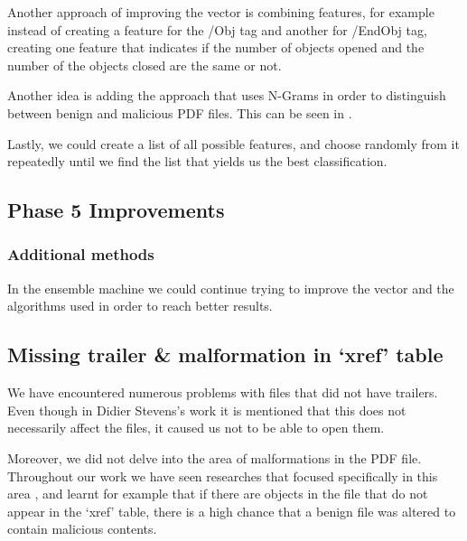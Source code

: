 \documentclass{article}
\begin{document}
\indent Another approach of improving the vector is combining features, for example instead of creating a feature for the /Obj tag and another for /EndObj tag, creating one feature that indicates if the number of objects opened and the number of the objects closed are the same or not.

\indent Another idea is adding the approach that uses N-Grams in order to distinguish between benign and malicious PDF files. This can be seen in \cite{Joachims1999Thorsten}.

\indent Lastly, we could create a list of all possible features, and choose randomly from it repeatedly until we find the list that yields us the best classification.

\subsection{Phase 5 Improvements}
\subsubsection{Additional methods}
\indent In the ensemble machine we could continue trying to improve the vector and the algorithms used in order to reach better results.

\subsection{Missing trailer \& malformation in ‘xref’ table}
\indent We have encountered numerous problems with files that did not have trailers. Even though in Didier Stevens’s work \cite{1} it is mentioned that this does not necessarily affect the files, it caused us not to be able to open them.

\indent Moreover, we did not delve into the area of malformations in the PDF file. Throughout our work we have seen researches that focused specifically in this area \cite{torres2018malicious} \cite{OtsuboChecker}, and learnt for example that if there are objects in the file that do not appear in the ‘xref’ table, there is a high chance that a benign file was altered to contain malicious contents.


\medskip
 
\end{document}
